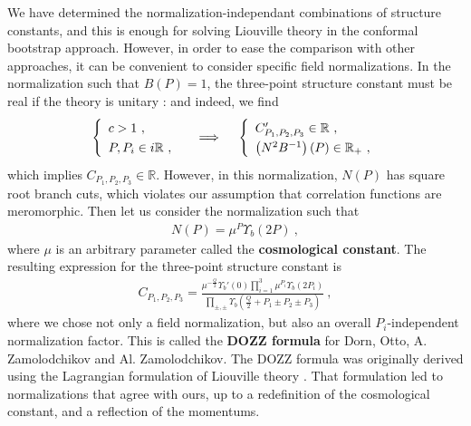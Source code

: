 \documentclass[12pt, a4paper, notitlepage, twoside]{report}
\numberwithin{equation}{section}
\theoremstyle{break}
\begin{document}
We have determined the normalization-independant combinations of structure constants, and this is enough for solving Liouville theory in the conformal bootstrap approach. However, in order to ease the comparison with other approaches, it can be convenient to consider specific field normalizations. 
In the normalization such that $B(P)=1$, the three-point structure constant must be real if the theory is unitary \cite{rib14b}: and indeed, we find
\begin{align}
\renewcommand{\arraystretch}{1.3}
 \left\{\begin{array}{l} c > 1\ , \\ P,P_i\in i\mathbb{R}\ , \end{array}\right. \quad \implies \quad \left\{\begin{array}{l} C'_{P_1,P_2,P_3}\in\mathbb{R}\ , \\ \left(N^2B^{-1}\right)(P)\in \mathbb{R}_+\ , \end{array}\right.
\end{align}
which implies $C_{P_1,P_2,P_3}\in \mathbb{R}$. However, in this normalization, $N(P)$ has square root branch cuts, which violates our assumption that correlation functions are meromorphic. Then let us  consider the normalization such that 
\begin{align}
 N(P) = \mu^{P}\Upsilon_b(2P)\ ,
 \label{nop}
\end{align}
where $\mu$ is an arbitrary parameter called the \textbf{\boldmath cosmological constant}.
The resulting expression for the three-point structure constant is
\begin{align}
 C_{P_1,P_2,P_3} =  \frac{\mu^{-\frac{Q}{2}}\Upsilon_b'(0)\prod_{i=1}^3 \mu^{P_i}\Upsilon_b(2P_i) }{\prod_{\pm,\pm} \Upsilon_b\left(\tfrac{Q}{2}+P_1\pm P_2 \pm P_3\right)} \ ,
\label{caaa}
\end{align}
where we chose not only a field normalization, but also an overall $P_i$-independent normalization factor. 
This is called the \textbf{\boldmath DOZZ formula} for Dorn, Otto, A.
Zamolodchikov and Al. Zamolodchikov. 
The DOZZ formula was originally derived using the Lagrangian formulation of Liouville theory \cite{zz95}. 
That formulation led to normalizations that agree with ours, 
up to a redefinition of the cosmological constant, and a reflection of the momentums. 
\end{document}
